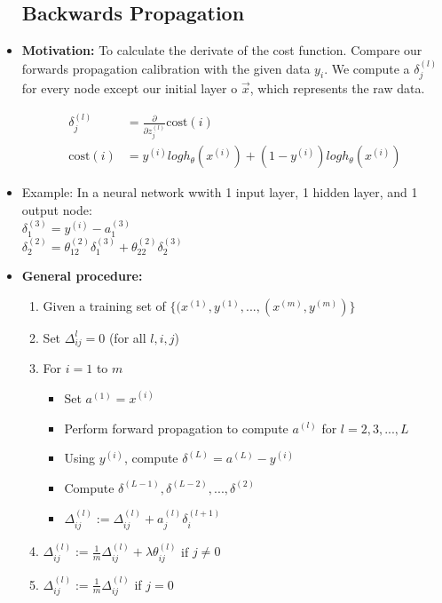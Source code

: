 \documentclass[titlepage]{article}
\begin{document}
\begin{itemize}
\subsection{Backwards Propagation}
\item \textbf{Motivation:} To calculate the derivate of the cost function. Compare our forwards propagation calibration with the given data $y_i$. We compute a 
$\delta_j^{(l)}$ for every node except our initial layer o $\vec x$, which represents the raw data.

\begin{align*}
\delta_j^{(l)} &= \frac{\partial}{\partial z_j^{(l)}} \text{cost}(i) \\
\text{cost}(i) &= y^{(i)}log h_\theta (x^{(i)}) + (1-y^{(i)}) log h_\theta (x^{(i)})
\end{align*}


\item Example: In a neural network wwith 1 input layer, 1 hidden layer, and 1 output node: \\
$\delta_1^{(3)} = y^{(i)} - a_1^{(3)}$ \\
$\delta_2^{(2)} = \theta_{12}^{(2)} \delta_1^{(3)} + \theta_{22}^{(2)} \delta_2^{(3)}$

\item \textbf{General procedure:}
\begin{enumerate}
\item Given a training set of $\{(x^{(1)}, y^{(1)},...,(x^{(m)}, y^{(m)})\}$
\item Set $\Delta_{ij}^{l} = 0 $ (for all $l,i,j$) \\
\item For $i=1$ to $m$

\begin{itemize} [label = $\bullet$]
	\item Set $a^{(1)} = x^{(i)}$
	\item Perform forward propagation to compute $a^{(l)}$ for $l=2,3,...,L$
	\item Using $y^{(i)}$, compute $\delta^{(L)}=a^{(L)} - y^{(i)}$
	\item Compute $\delta^{(L-1)}, \delta^{(L-2)},...,\delta^{(2)}$
	\item $\Delta_{ij}^{(l)} := \Delta_{ij}^{(l)} + a_j^{(l)}\delta_i^{(l+1)}$
\end{itemize}

\item $\Delta_{ij}^{(l)}:= \frac{1}{m}\Delta_{ij}^{(l)} + \lambda \theta_{ij} ^{(l)}$ if $j \neq 0$
\item $\Delta_{ij}^{(l)}:= \frac{1}{m}\Delta_{ij}^{(l)}$ if $j=0$
\end{enumerate}


\end{itemize}
\end{document}
